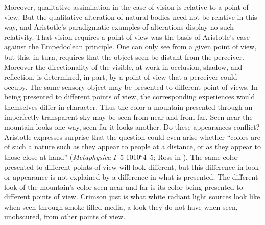 Moreover, qualitative assimilation in the case of vision is relative to a point of view. But the qualitative alteration of natural bodies need not be relative in this way, and Aristotle's paradigmatic examples of alterations display no such relativity. That vision requires a point of view was the basis of Aristotle's case against the Empedoclean principle. One can only see from a given point of view, but this, in turn, requires that the object seen be distant from the perceiver. Moreover the directionality of the visible, at work in occlusion, shadow, and reflection, is determined, in part, by a point of view that a perceiver could occupy. The same sensory object may be presented to different point of views. In being presented to different points of view, the corresponding experiences would themselves differ in character. Thus the color a mountain presented through an imperfectly transparent sky may be seen from near and from far. Seen near the mountain looks one way, seen far it looks another. Do these appearances conflict? Aristotle expresses surprise that the question could even arise whether ``colors are of such a nature such as they appear to people at a distance, or as they appear to those close at hand'' (\emph{Metaphysica} \( \Gamma \) 5 1010\( ^{b} \)4--5; Ross in \citealt[55]{Barnes:1984kx}). The same color presented to different points of view will look different, but this difference in look or appearance is not explained by a difference in what is presented. The different look of the mountain's color seen near and far is its color being presented to different points of view. Crimson just is what white radiant light sources look like when seen through smoke-filled media, a look they do not have when seen, unobscured, from other points of view.

